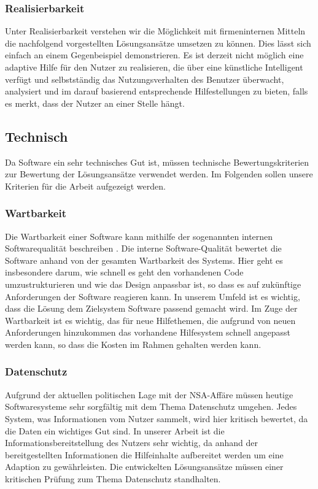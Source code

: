 \subsubsection{Realisierbarkeit}
Unter Realisierbarkeit verstehen wir die Möglichkeit mit firmeninternen Mitteln die nachfolgend vorgestellten Lösungsansätze umsetzen zu können. Dies lässt sich einfach an einem Gegenbeispiel demonstrieren. Es ist derzeit nicht möglich eine adaptive Hilfe für den Nutzer zu realisieren, die über eine künstliche Intelligent verfügt und selbstständig das Nutzungsverhalten des Benutzer überwacht, analysiert und im  darauf basierend entsprechende Hilfestellungen zu bieten, falls es merkt, dass der Nutzer an einer Stelle hängt.

\subsection{Technisch}
Da Software ein sehr technisches Gut ist, müssen technische Bewertungskriterien zur Bewertung der Lösungsansätze verwendet werden. Im Folgenden sollen unsere Kriterien für die Arbeit aufgezeigt werden.

\subsubsection{Wartbarkeit}
Die Wartbarkeit einer Software kann mithilfe der sogenannten internen Softwarequalität beschreiben \cite{softwareQuality}. Die interne Software-Qualität bewertet die Software anhand von der gesamten Wartbarkeit des Systems. Hier geht es insbesondere darum, wie schnell es geht den vorhandenen Code umzustrukturieren und wie das Design anpassbar ist, so dass es auf zukünftige Anforderungen der Software reagieren kann. In unserem Umfeld ist es wichtig, dass die Lösung dem Zielsystem Software passend gemacht wird. Im Zuge der Wartbarkeit ist es wichtig, das für neue Hilfethemen, die aufgrund von neuen Anforderungen hinzukommen das vorhandene Hilfesystem schnell angepasst werden kann, so dass die Kosten im Rahmen gehalten werden kann.
\subsubsection{Datenschutz}
Aufgrund der aktuellen politischen Lage mit der NSA-Affäre müssen heutige Softwaresysteme sehr sorgfältig mit dem Thema Datenschutz umgehen. Jedes System, was Informationen vom Nutzer sammelt, wird hier kritisch bewertet, da die Daten ein wichtiges Gut sind. In unserer Arbeit ist die Informationsbereitstellung des Nutzers sehr wichtig, da anhand der bereitgestellten Informationen die Hilfeinhalte aufbereitet werden um eine Adaption zu gewährleisten. Die entwickelten Lösungsansätze müssen einer kritischen Prüfung zum Thema Datenschutz standhalten.

